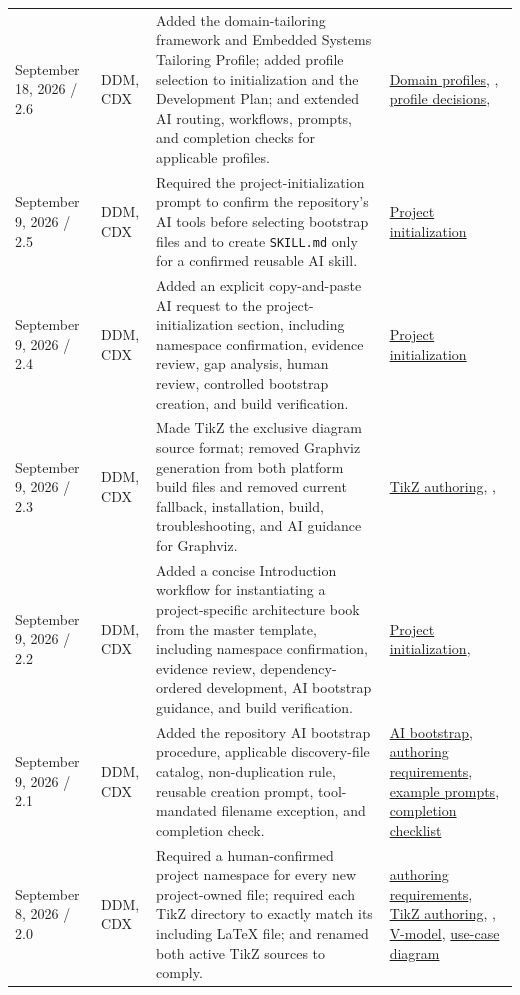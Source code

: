 \begin{tabularx}{\linewidth}{L{3.1cm}L{2.2cm}YL{2.5cm}}
September 18, 2026 / 2.6 & DDM, CDX & Added the domain-tailoring framework and Embedded Systems Tailoring Profile; added profile selection to initialization and the Development Plan; and extended AI routing, workflows, prompts, and completion checks for applicable profiles. & \hyperref[Section:DomainProfiles]{Domain profiles}, , \hyperref[Section:DevelopmentPlanProfiles]{profile decisions}, \\
September 9, 2026 / 2.5 & DDM, CDX & Required the project-initialization prompt to confirm the repository's AI tools before selecting bootstrap files and to create \texttt{SKILL.md} only for a confirmed reusable AI skill. & \hyperref[Section:InitializeNewProject]{Project initialization}\\
September 9, 2026 / 2.4 & DDM, CDX & Added an explicit copy-and-paste AI request to the project-initialization section, including namespace confirmation, evidence review, gap analysis, human review, controlled bootstrap creation, and build verification. & \hyperref[Section:InitializeNewProject]{Project initialization}\\
September 9, 2026 / 2.3 & DDM, CDX & Made TikZ the exclusive diagram source format; removed Graphviz generation from both platform build files and removed current fallback, installation, build, troubleshooting, and AI guidance for Graphviz. & \hyperref[Section:TikZAuthoring]{TikZ authoring}, , \\
September 9, 2026 / 2.2 & DDM, CDX & Added a concise Introduction workflow for instantiating a project-specific architecture book from the master template, including namespace confirmation, evidence review, dependency-ordered development, AI bootstrap guidance, and build verification. & \hyperref[Section:InitializeNewProject]{Project initialization}, \\
September 9, 2026 / 2.1 & DDM, CDX & Added the repository AI bootstrap procedure, applicable discovery-file catalog, non-duplication rule, reusable creation prompt, tool-mandated filename exception, and completion check. & \hyperref[Section:AIRepositoryBootstrap]{AI bootstrap}, \hyperref[Table:DocumentAuthoringRequirements]{authoring requirements}, \hyperref[Section:AIExamplePrompts]{example prompts}, \hyperref[Table:AICompletionChecklist]{completion checklist}\\
September 8, 2026 / 2.0 & DDM, CDX & Required a human-confirmed project namespace for every new project-owned file; required each TikZ directory to exactly match its including LaTeX file; and renamed both active TikZ sources to comply. & \hyperref[Table:DocumentAuthoringRequirements]{authoring requirements}, \hyperref[Section:TikZAuthoring]{TikZ authoring}, , \hyperref[Figure:VModel]{V-model}, \hyperref[Figure:UseCaseDiagram]{use-case diagram}\\

\end{tabularx}
